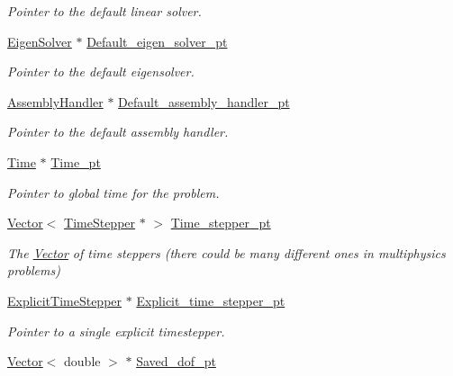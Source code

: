\begin{DoxyCompactItemize}
\begin{DoxyCompactList}\small\item\em Pointer to the default linear solver. \end{DoxyCompactList}\item 
\hyperlink{classoomph_1_1EigenSolver}{Eigen\+Solver} $\ast$ \hyperlink{classoomph_1_1Problem_a39fd6a7e05c02befe9f2a09938a7a7a4}{Default\+\_\+eigen\+\_\+solver\+\_\+pt}
\begin{DoxyCompactList}\small\item\em Pointer to the default eigensolver. \end{DoxyCompactList}\item 
\hyperlink{classoomph_1_1AssemblyHandler}{Assembly\+Handler} $\ast$ \hyperlink{classoomph_1_1Problem_ae0cebe288c8daddd9663bd10d8f1caa0}{Default\+\_\+assembly\+\_\+handler\+\_\+pt}
\begin{DoxyCompactList}\small\item\em Pointer to the default assembly handler. \end{DoxyCompactList}\item 
\hyperlink{classoomph_1_1Time}{Time} $\ast$ \hyperlink{classoomph_1_1Problem_ae33fbf5f34a7d06d88ad2c98538bbbe8}{Time\+\_\+pt}
\begin{DoxyCompactList}\small\item\em Pointer to global time for the problem. \end{DoxyCompactList}\item 
\hyperlink{classoomph_1_1Vector}{Vector}$<$ \hyperlink{classoomph_1_1TimeStepper}{Time\+Stepper} $\ast$ $>$ \hyperlink{classoomph_1_1Problem_af1e8f8a739453250eb3744fea2a3b983}{Time\+\_\+stepper\+\_\+pt}
\begin{DoxyCompactList}\small\item\em The \hyperlink{classoomph_1_1Vector}{Vector} of time steppers (there could be many different ones in multiphysics problems) \end{DoxyCompactList}\item 
\hyperlink{classoomph_1_1ExplicitTimeStepper}{Explicit\+Time\+Stepper} $\ast$ \hyperlink{classoomph_1_1Problem_af8466091ea4f5b57033bb3ad24831167}{Explicit\+\_\+time\+\_\+stepper\+\_\+pt}
\begin{DoxyCompactList}\small\item\em Pointer to a single explicit timestepper. \end{DoxyCompactList}\item 
\hyperlink{classoomph_1_1Vector}{Vector}$<$ double $>$ $\ast$ \hyperlink{classoomph_1_1Problem_aeef791a0158657ca7c298ffcb63ed54e}{Saved\+\_\+dof\+\_\+pt}

\end{DoxyCompactItemize}
